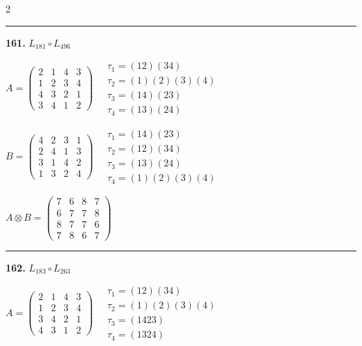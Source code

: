 \begin{multicols}{2}
\vspace{0.3em}
\hrule
\vspace{0.3em}

\noindent\textbf{161.} $L_{181} \circ L_{496}$

$A = \begin{pmatrix} 2 & 1 & 4 & 3 \\ 1 & 2 & 3 & 4 \\ 4 & 3 & 2 & 1 \\ 3 & 4 & 1 & 2 \end{pmatrix} \quad \begin{matrix} \tau_{1}=(1 2)(3 4) \\ \tau_{2}=(1)(2)(3)(4) \\ \tau_{3}=(1 4)(2 3) \\ \tau_{4}=(1 3)(2 4) \end{matrix}$

$B = \begin{pmatrix} 4 & 2 & 3 & 1 \\ 2 & 4 & 1 & 3 \\ 3 & 1 & 4 & 2 \\ 1 & 3 & 2 & 4 \end{pmatrix} \quad \begin{matrix} \tau_{1}=(1 4)(2 3) \\ \tau_{2}=(1 2)(3 4) \\ \tau_{3}=(1 3)(2 4) \\ \tau_{4}=(1)(2)(3)(4) \end{matrix}$

$A \otimes B = \begin{pmatrix} 7 & 6 & 8 & 7 \\ 6 & 7 & 7 & 8 \\ 8 & 7 & 7 & 6 \\ 7 & 8 & 6 & 7 \end{pmatrix}$

\vspace{0.3em}
\hrule
\vspace{0.3em}

\noindent\textbf{162.} $L_{183} \circ L_{263}$

$A = \begin{pmatrix} 2 & 1 & 4 & 3 \\ 1 & 2 & 3 & 4 \\ 3 & 4 & 2 & 1 \\ 4 & 3 & 1 & 2 \end{pmatrix} \quad \begin{matrix} \tau_{1}=(1 2)(3 4) \\ \tau_{2}=(1)(2)(3)(4) \\ \tau_{3}=(1 4 2 3) \\ \tau_{4}=(1 3 2 4) \end{matrix}$


\end{multicols}
